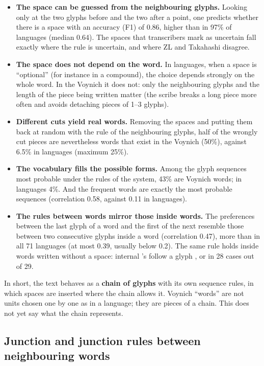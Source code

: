 \begin{itemize}
\item \textbf{The space can be guessed from the neighbouring glyphs.} Looking only at the two glyphs before and the two
  after a point, one predicts whether there is a space with an accuracy (F1) of 0.86, higher than in 97\% of languages
  (median 0.64). The spaces that transcribers mark as uncertain fall exactly where the rule is uncertain, and where ZL and
  Takahashi disagree.
\item \textbf{The space does not depend on the word.} In languages, when a space is ``optional'' (for instance in a
  compound), the choice depends strongly on the whole word. In the Voynich it does not: only the neighbouring glyphs and
  the length of the piece being written matter (the scribe breaks a long piece more often and avoids detaching pieces of
  1--3 glyphs).
\item \textbf{Different cuts yield real words.} Removing the spaces and putting them back at random with the rule of the
  neighbouring glyphs, half of the wrongly cut pieces are nevertheless words that exist in the Voynich (50\%), against
  6.5\% in languages (maximum 25\%).
\item \textbf{The vocabulary fills the possible forms.} Among the glyph sequences most probable under the rules of the
  system, 43\% are Voynich words; in languages 4\%. And the frequent words are exactly the most probable sequences
  (correlation 0.58, against 0.11 in languages).
\item \textbf{The rules between words mirror those inside words.} The preferences between the last glyph of a word and
  the first of the next resemble those between two consecutive glyphs inside a word (correlation 0.47), more than in all
  71 languages (at most 0.39, usually below 0.2). The same rule holds inside words written without a space: internal
  's follow a glyph ,  or  in 28 cases out of 29.
\end{itemize}

\noindent In short, the text behaves as a \textbf{chain of glyphs} with its own sequence rules, in which spaces are
inserted where the chain allows it. Voynich ``words'' are not units chosen one by one as in a language; they are pieces
of a chain. This does not yet say what the chain represents.

\subsection{Junction and junction rules between neighbouring words}

